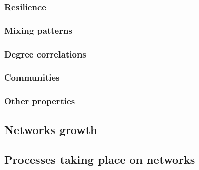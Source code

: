 		\subsubsection{Resilience}
			
		\subsubsection{Mixing patterns}
			
		\subsubsection{Degree correlations}
		
		\subsubsection{Communities}
			
		\subsubsection{Other properties}
		
	\subsection{Networks growth}
		
	\subsection{Processes taking place on networks}